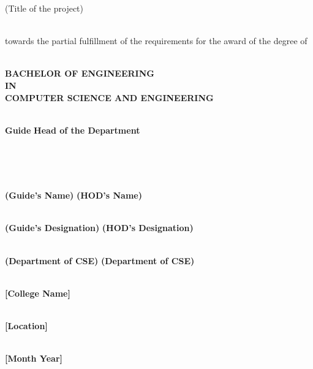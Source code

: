 \documentclass[12pt, a4paper]{report}
\begin{document}
\begin{titlepage}
\begin{center}
​​​(Title of the project)\\

​​​\vspace{0.2in}

​​​towards the partial fulfillment of the requirements for the award of the degree of\\

​​​\vspace{0.2in}

​​​\textbf{BACHELOR OF ENGINEERING\\IN\\COMPUTER SCIENCE AND ENGINEERING}\\

​​​\vspace{0.5in}

​​​\textbf{Guide} \hspace{3.5in} \textbf{Head of the Department}\\

​​​\vspace{0.3in}

​​​\underline{\hspace{6cm}} \hspace{1.5in} \underline{\hspace{6cm}}\\

​​​\vspace{0.1in}

​​​\textbf{(Guide's Name)} \hspace{2.7in} \textbf{(HOD's Name)}\\

​​​\vspace{0.1in}

​​​\textbf{(Guide's Designation)} \hspace{2in} \textbf{(HOD's Designation)}\\

​​​\vspace{0.1in}

​​​\textbf{(Department of CSE)} \hspace{2.1in} \textbf{(Department of CSE)}\\

​​​\vspace{0.1in}

​​​\textbf{[College Name]}\\

​​​\vspace{0.1in}

​​​\textbf{[Location]}\\

​​​\vspace{0.1in}

​​​\textbf{[Month Year]} %

​​\end{center}

​\end{titlepage}

​
\end{document}
